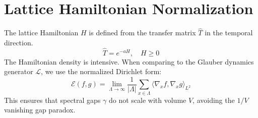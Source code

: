 \section{Lattice Hamiltonian Normalization}
The lattice Hamiltonian $H$ is defined from the transfer matrix $\hat{T}$ in the temporal direction.
\begin{equation}
    \hat{T} = e^{-a H}, \quad H \ge 0
\end{equation}
The Hamiltonian density is intensive. When comparing to the Glauber dynamics generator $\mathcal{L}$, we use the normalized Dirichlet form:
\begin{equation}
    \mathcal{E}(f,g) = \lim_{\Lambda \to \infty} \frac{1}{|\Lambda|} \sum_{x \in \Lambda} \langle \nabla_x f, \nabla_x g \rangle_{L^2}
\end{equation}
This ensures that spectral gaps $\gamma$ do not scale with volume $V$, avoiding the $1/V$ vanishing gap paradox.
